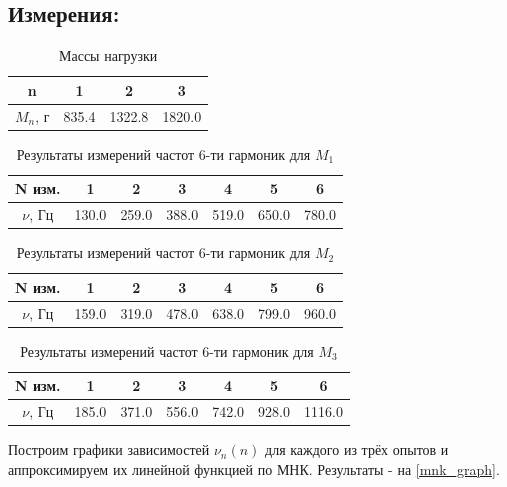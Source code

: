 \documentclass[
a4paper, %
12pt, %
]{article}
\begin{document}
	\subsection{Измерения:}
	
	\begin{table}[h]
		\centering
		\begin{tabular}{|c|c|c|c|}
			\hline
			n & 1 & 2 & 3  \\
			\hline
			$M_n$, г & 835.4 & 1322.8 & 1820.0 \\
			\hline
		\end{tabular}
		\caption{Массы нагрузки}
	\end{table}
	
	
	\begin{table}[h]
		\centering
		\begin{tabular}{|c|c|c|c|c|c|c|}
			\hline
			N изм. & 1 & 2 & 3 & 4 & 5 & 6 \\
			\hline
			$\nu$, Гц & 130.0 & 259.0 & 388.0 & 519.0 & 650.0 & 780.0 \\
			\hline
		\end{tabular}
		\caption{Результаты измерений частот 6-ти гармоник для $M_1$}
	\end{table}
	
	\begin{table}[h!]
		\centering
		\begin{tabular}{|c|c|c|c|c|c|c|}
			\hline
			N изм. & 1 & 2 & 3 & 4 & 5 & 6 \\
			\hline
			$\nu$, Гц & 159.0 & 319.0 & 478.0 & 638.0 & 799.0 & 960.0 \\
			\hline
		\end{tabular}
		\caption{Результаты измерений частот 6-ти гармоник для $M_2$}
	\end{table}
	
	\begin{table}[h!]
		\centering
		\begin{tabular}{|c|c|c|c|c|c|c|}
			\hline
			N изм. & 1 & 2 & 3 & 4 & 5 & 6 \\
			\hline
			$\nu$, Гц & 185.0 & 371.0 & 556.0 & 742.0 & 928.0 & 1116.0 \\
			\hline
		\end{tabular}
		\caption{Результаты измерений частот 6-ти гармоник для $M_3$}
	\end{table}
	
	
	Построим графики зависимостей $\nu_n(n)$ для каждого из трёх опытов и аппроксимируем их линейной функцией по МНК. Результаты - на \ref{mnk_graph}.
	
\end{document}
